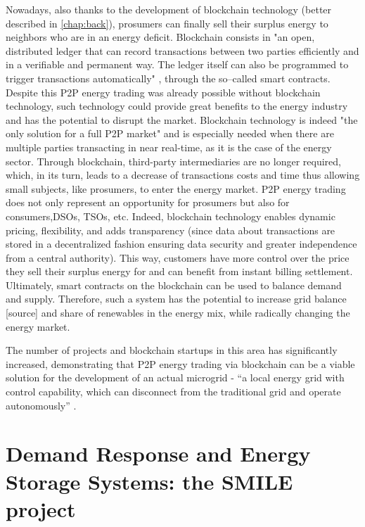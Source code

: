 Nowadays, also thanks to the development of blockchain technology (better described in \cref{chap:back}), prosumers can finally sell their surplus energy to neighbors who are in an energy deficit. Blockchain consists in "an open, distributed ledger that can record transactions between two parties efficiently and in a verifiable and permanent way. The ledger itself can also be programmed to trigger transactions automatically" \cite{TruthBlockchain}, through the so--called smart contracts. Despite this \ac{P2P} energy trading was already possible without blockchain technology, such technology could provide great benefits to the energy industry and has the potential to disrupt the market. Blockchain technology is indeed "the only solution for a full \ac{P2P} market" \cite{Powerledger} and is especially needed when there are multiple parties transacting in near real-time, as it is the case of the energy sector. Through blockchain, third-party intermediaries are no longer required, which, in its turn, leads to a decrease of transactions costs and time thus allowing small subjects, like prosumers, to enter the energy market.
\ac{P2P} energy trading does not only represent an opportunity for prosumers but also for consumers,\acp{DSO}, \acp{TSO}, etc. Indeed, blockchain technology enables dynamic pricing, flexibility, and adds transparency (since data about transactions are stored in a decentralized fashion ensuring data security and greater independence from a central authority). This way, customers have more control over the price they sell their surplus energy for and can benefit from instant billing settlement. Ultimately, smart contracts on the blockchain can be used to balance demand and supply. Therefore, such a system has the potential to increase grid balance [source] and share of renewables in the energy mix, while radically changing the energy market.



The number of projects and blockchain startups in this area has significantly increased, demonstrating that \ac{P2P} energy trading via blockchain can be a viable solution for the development of an actual microgrid - “a local energy grid with control capability, which can disconnect from the traditional grid and operate autonomously” \cite{HowMicrogridWorks}.


\section{Demand Response and Energy Storage Systems: the SMILE project}

